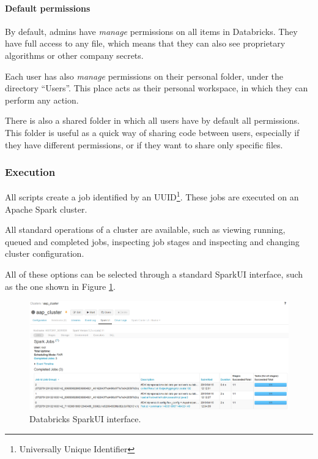     \paragraph{Default permissions}
        By default, admins have \textit{manage} permissions on all items in Databricks.
        They have full access to any file, which means that they can also see proprietary algorithms or other company secrets.
        
        Each user has also \textit{manage} permissions on their personal folder, under the directory ``Users''.
        This place acts as their personal workspace, in which they can perform any action.
        
        There is also a shared folder in which all users have by default all permissions.
        This folder is useful as a quick way of sharing code between users, especially if they have different permissions, or if they want to share only specific files.

\subsubsection{Execution}
    All scripts create a job identified by an UUID\footnote{Universally Unique Identifier}.
    These jobs are executed on an Apache Spark cluster.
    
    All standard operations of a cluster are available, such as viewing running, queued and completed jobs, inspecting job stages and inspecting and changing cluster configuration.
    
    All of these options can be selected through a standard SparkUI interface, such as the one shown in Figure \ref{fig:azure:databricks:sparkui}.
    
    \begin{figure}
        \centering
        \includegraphics[width=\textwidth]{res/azure/databricks/sparkui.png}
        \caption{Databricks SparkUI interface.}
        \label{fig:azure:databricks:sparkui}
    \end{figure}
    
